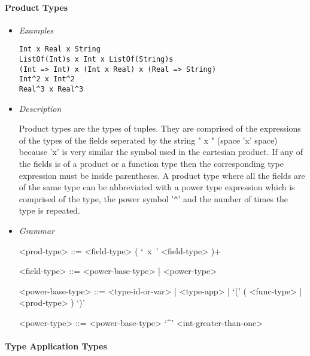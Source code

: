 \documentclass{article}
\begin{document}
\paragraph{Product Types}

\begin{itemize}
\item \textit{Examples}
\begin{verbatim}
Int x Real x String
ListOf(Int)s x Int x ListOf(String)s
(Int => Int) x (Int x Real) x (Real => String)
Int^2 x Int^2
Real^3 x Real^3
\end{verbatim}

\item \textit{Description}

Product types are the types of tuples. They are comprised of the expressions of
the types of the fields seperated by the string " x " (space 'x' space) because
'x' is very similar the symbol used in the cartesian product. If any of the
fields is of a product or a function type then the corresponding type expression
must be inside parentheses. A product type where all the fields are of the same
type can be abbreviated with a power type expression which is comprised of the 
type, the power symbol '\texttt{\^}' and the number of times the type is repeated.

\item \textit{Grammar}
\begin{grammar}
<prod-type> ::= <field-type> ( `\ x\ ' <field-type> )+

<field-type> ::= <power-base-type> | <power-type>

<power-base-type> ::=
<type-id-or-var> | <type-app> | `(' ( <func-type> | <prod-type> ) `)'

<power-type> ::= <power-base-type> `^' <int-greater-than-one>
\end{grammar}
\end{itemize}

\paragraph{Type Application Types}
\end{document}
